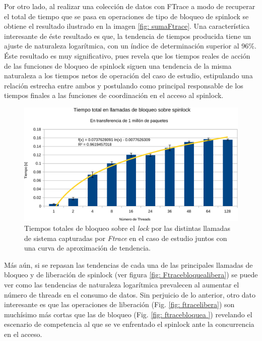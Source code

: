 Por otro lado, al realizar una colección de datos con FTrace a modo de recuperar el total de tiempo que se pasa en operaciones de tipo de bloqueo de spinlock se obtiene el resultado ilustrado en la imagen \ref{fig: sumaFtrace}. Una característica interesante de éste resultado es que, la tendencia de tiempos producida tiene un ajuste de naturaleza logarítmica, con un índice de determinación superior al 96\%. Éste resultado es muy significativo, pues revela que los tiempos reales de acción de las funciones de bloqueo de spinlock siguen una tendencia de la misma naturaleza a los tiempos netos de operación del caso de estudio, estipulando una relación estrecha entre ambos y postulando como principal responsable de los tiempos finales a las funciones de coordinación en el acceso al spinlock.

\begin{figure}[!h]
	\centering
	\includegraphics[scale=.5]{resultados/sumaFtrace-crop.pdf}
	\caption{Tiempos totales de bloqueo sobre el \emph{lock} por las distintas llamadas de sistema capturadas por \emph{Ftrace} en el caso de estudio juntos con una curva de aproximación de tendencia.}
	\label{fig:sumaFtrace}
\end{figure}
Más aún, si se repasan las tendencias de cada una de las principales llamadas de bloqueo y de liberación de spinlock (ver figura \ref{fig: Ftracebloquealibera}) se puede ver como las tendencias de naturaleza logarítmica prevalecen al aumentar el número de threads en el consumo de datos. Sin perjuicio de lo anterior, otro dato interesante es que las operaciones de liberación (Fig. \ref{fig: ftracelibera}) son muchísimo más cortas que las de bloqueo (Fig. \ref{fig: ftracebloquea }) revelando el escenario de competencia al que se ve enfrentado el spinlock ante la concurrencia en el acceso.

